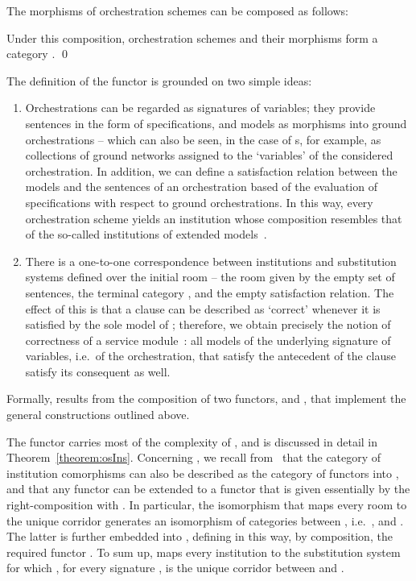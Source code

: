 \documentclass{LMCS}
\begin{document}
  \begin{prop}
    The morphisms of orchestration schemes can be composed as follows:
    
    Under this composition, orchestration schemes and their morphisms form a category .
    \qed
  \end{prop}

  The definition of the functor  is grounded on two simple ideas:
  \begin{enumerate}

  \item Orchestrations can be regarded as signatures of variables; they provide sentences in the form of specifications, and models as morphisms into ground orchestrations -- which can also be seen, in the case of s, for example, as collections of ground networks assigned to the `variables' of the considered orchestration.  In addition, we can define a satisfaction relation between the models and the sentences of an orchestration based of the evaluation of specifications with respect to ground orchestrations.  In this way, every orchestration scheme yields an institution whose composition resembles that of the so-called institutions of extended models~\cite{Schroder-Mossakowski-Luth:Type-class-polymorphism-2004}.

  \item There is a one-to-one correspondence between institutions and substitution systems defined over the initial room  -- the room given by the empty set of sentences, the terminal category , and the empty satisfaction relation.  The effect of this is that a clause can be described as `correct' whenever it is satisfied by the sole model of ; therefore, we obtain precisely the notion of correctness of a service module~\cite{Fiadeiro-Lopes-Bocchi:An-abstract-model-for-service-discovery-and-binding-2011}: all models of the underlying signature of variables, i.e.\ of the orchestration, that satisfy the antecedent of the clause satisfy its consequent as well.

  \end{enumerate}
  Formally,  results from the composition of two functors,  and , that implement the general constructions outlined above.
  
  The functor  carries most of the complexity of , and is discussed in detail in Theorem~\ref{theorem:osIns}.
  Concerning , we recall from~\cite{Tutu-Fiadeiro:Institution-independent-logic-programming-2015} that the category  of institution comorphisms can also be described as the category  of functors into , and that any functor  can be extended to a functor  that is given essentially by the right-composition with .
  In particular, the isomorphism  that maps every room  to the unique corridor  generates an isomorphism of categories between , i.e.\ , and .  The latter is further embedded into , defining in this way, by composition, the required functor .
  To sum up,  maps every institution  to the substitution system  for which , for every signature , is the unique corridor between  and .
\end{document}
